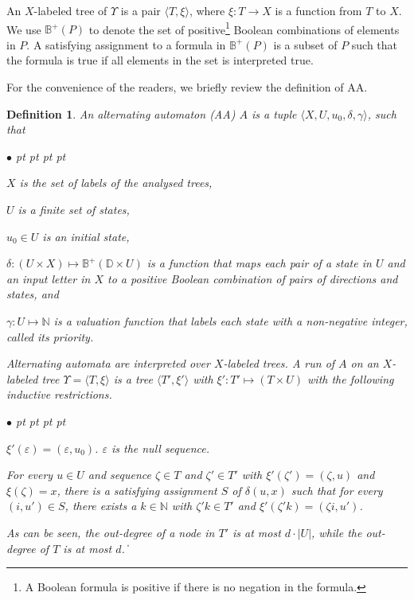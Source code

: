 \documentclass[11pt]{article}
\newtheorem{definition}{Definition}
\newcommand{\bbbbb}{{\mathbb B}}
\newcommand{\bbbbd}{{\mathbb D}}
\newcommand{\nnneg}{{\mathbb N}}
\def\qed{\ifmmode\|\else{\unskip\nobreak\hfil
\penalty50\hskip1em\null\nobreak\hfil$\blacksquare$
\parfillskip=0pt\finalhyphendemerits=0\endgraf}\fi}
\newenvironment{list1}{\begin{list}{$\bullet$}
{\topsep 0 pt \parsep 0 pt \partopsep 0 pt \itemsep 0 pt}}{\end{list}}
\begin{document}
An $X$-labeled tree of $\Upsilon$ is a pair $\langle T,\xi\rangle$, 
where $\xi:T\rightarrow X$ is a function from $T$ to $X$.  
We use $\bbbbb^+(P)$ to denote the 
set of positive\footnote{A Boolean formula is positive if there is 
no negation in the formula.} 
Boolean combinations of elements in $P$.  
A satisfying assignment to a formula in $\bbbbb^+(P)$ is 
a subset of $P$ such that 
the formula is true if \label{reply2.iff.2.if}  
all elements in the set is interpreted true.  

For the convenience of the readers, we briefly review the 
definition of AA.  

\begin{definition}  
An alternating automaton ({\em AA}) 
$A$ is a tuple $\langle X,U,u_0,\delta,\gamma\rangle$, such that
\begin{list1} 
\item $X$ is the set of labels of the analysed trees,
\item $U$ is a finite set of states,
\item $u_0\in U$ is an initial state, 
\item $\delta:(U\times X)\mapsto \bbbbb^+(\bbbbd\times U)$ 
  is a function that maps each pair of a state in $U$ 
  and an input letter in $X$\label{reply2.chi.2.X} to 
  a positive Boolean combination of pairs of directions and states, and
\item $\gamma:U\mapsto \nnneg$ is a valuation function that 
  labels each state with a non-negative integer, called its {\em priority}.  
\end{list1} 
Alternating automata are interpreted over $X$-labeled trees.
A \emph{run} of $A$ 
on an $X$-labeled tree $\Upsilon=\langle T,\xi\rangle$ is a tree 
$\langle T',\xi' \rangle$ 
with $\xi':T' \mapsto (T\times U)$ with the following 
inductive restrictions. 
\begin{list1}
\item $\xi'(\varepsilon)=(\varepsilon,u_0)$.  
  $\varepsilon$ is the null sequence. 
\item For every $u\in U$ and sequence $\zeta\in T$ and $\zeta'\in T'$ 
  with $\xi'(\zeta')=(\zeta,u)$ and $\xi(\zeta)=x$, 
  there is a satisfying assignment 
  $S$ of $\delta(u,x)$ such that 
  for every $(i,u')\in S$, there exists a $k\in\nnneg$ with 
  $\zeta'k\in T'$ and $\xi'(\zeta'k)=(\zeta i, u')$.  
\end{list1}
As can be seen, the out-degree of a node in $T'$ is at most $d\cdot|U|$, 
while the out-degree of $T$ is at most $d$.  
\qed 
\end{definition} 
\end{document}
